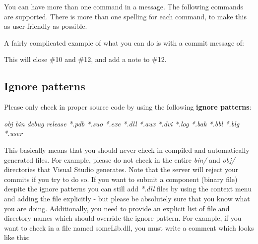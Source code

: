 \begin{center}
\end{center}

You can have more than one command in a message. The following commands are supported. There is more than one spelling for each command, to make this as user-friendly as possible.

\begin{center}
\end{center}

A fairly complicated example of what you can do is with a commit message of:

\begin{center}
\end{center}

This will close \#10 and \#12, and add a note to \#12.

\subsection*{Ignore patterns}
\label{IgnorePatterns}

Please only check in proper source code by using the following \textbf{ignore patterns}:

\begin{center}
\textit{obj bin debug release *.pdb *.suo *.exe *.dll *.aux *.dvi *.log *.bak *.bbl *.blg *.user}
\end{center}

This basically means that you should never check in compiled and automatically generated files. For example, please do not check in the entire \textit{bin/} and \textit{obj/} directories that Visual Studio generates. Note that the server will reject your commits if you try to do so. If you want to submit a component (binary file) despite the ignore patterns you can still add \textit{*.dll} files by using the context menu and adding the file explicitly - but please be absolutely sure that you know what you are doing. Additionally, you need to provide an explicit list of file and directory names which should override the ignore pattern. For example, if you want to check in a file named someLib.dll, you must write a comment which looks like this:

